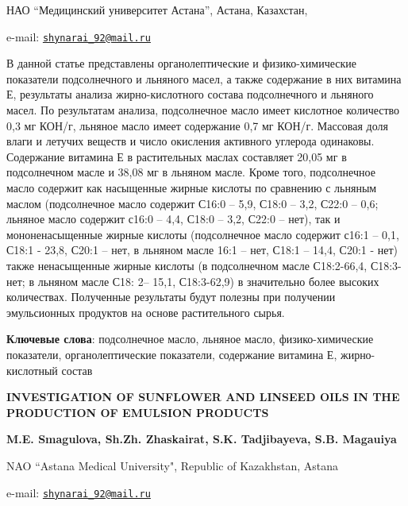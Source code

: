 \begin{affiliation}
НАО ``Медицинский университет Астана'', Астана, Казахстан,

e-mail:
\href{mailto:shynarai\_92@mail.ru}{\nolinkurl{shynarai\_92@mail.ru}}
\end{affiliation}

В данной статье представлены органолептические и физико-химические
показатели подсолнечного и льняного масел, а также содержание в них
витамина Е, результаты анализа жирно-кислотного состава подсолнечного и
льняного масел. По результатам анализа, подсолнечное масло имеет
кислотное количество 0,3 мг КОН/г, льняное масло имеет содержание 0,7 мг
КОН/г. Массовая доля влаги и летучих веществ и число окисления активного
углерода одинаковы. Содержание витамина Е в растительных маслах
составляет 20,05 мг в подсолнечном масле и 38,08 мг в льняном масле.
Кроме того, подсолнечное масло содержит как насыщенные жирные кислоты по
сравнению с льняным маслом (подсолнечное масло содержит С16:0 -- 5,9,
С18:0 -- 3,2, С22:0 -- 0,6; льняное масло содержит с16:0 -- 4,4, С18:0
-- 3,2, С22:0 -- нет), так и мононенасыщенные жирные кислоты
(подсолнечное масло содержит с16:1 -- 0,1, С18:1 - 23,8, С20:1 -- нет, в
льняном масле 16:1 -- нет, С18:1 -- 14,4, С20:1 - нет) также
ненасыщенные жирные кислоты (в подсолнечном масле С18:2-66,4, С18:3-нет;
в льняном масле С18: 2-- 15,1, С18:3-62,9) в значительно более высоких
количествах. Полученные результаты будут полезны при получении
эмульсионных продуктов на основе растительного сырья.

{\bfseries Ключевые слова}: подсолнечное масло, льняное масло,
физико-химические показатели, органолептические показатели, содержание
витамина Е, жирно-кислотный состав

\begin{articleheader}
{\bfseries INVESTIGATION OF SUNFLOWER AND LINSEED OILS IN THE PRODUCTION OF
EMULSION PRODUCTS}

{\bfseries
M.E. Smagulova,
Sh.Zh. Zhaskairat\textsuperscript{\envelope },
S.K. Tadjibayeva,
S.B. Magauiya
}
\end{articleheader}

\begin{affiliation}
NAO ``Astana Medical University", Republic of Kazakhstan, Astana

e-mail: \href{mailto:shynarai\_92@mail.ru}{\nolinkurl{shynarai\_92@mail.ru}}
\end{affiliation}


